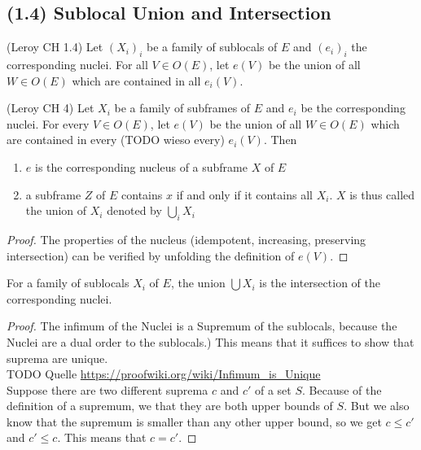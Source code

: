 \subsection{(1.4) Sublocal Union and Intersection}

\begin{definition}
(Leroy CH 1.4)
    \label{def:sublocal_union}
    \leanok
    Let $(X_i)_i$ be a family of sublocals of $E$ and $(e_i)_i$ the corresponding nuclei.
    For all $V \in O(E)$, let $e(V)$ be the union of all $W \in O(E)$ which are contained in all $e_i(V)$.
\end{definition}

\begin{lemma}
(Leroy CH 4)
    \label{lem:sublocal_union}
    \leanok
    Let $X_i$ be a family of subframes of $E$ and $e_i$ be the corresponding nuclei. For every $V \in O(E)$, let
    $e(V)$ be the union of all $W \in O(E)$ which are contained in every (TODO wieso every) $e_i(V)$. Then \\
    \begin{enumerate}
        \item $e$ is the corresponding nucleus of a subframe $X$ of $E$
        \item a subframe $Z$ of $E$ contains $x$ if and only if it contains all $X_i$. $X$ is thus called the union of
        $X_i$ denoted by $\bigcup_i X_i$
    \end{enumerate}
\end{lemma}
\begin{proof}
    The properties of the nucleus (idempotent, increasing, preserving intersection) can be verified by unfolding the
    definition of $e(V)$.
    \leanok
\end{proof}

\begin{lemma}
    \label{lem:sublocal_union_nucleus_intersection}
    \leanok
    For a family of sublocals $X_i$ of $E$, the union $\bigcup X_i$ is the intersection of the corresponding nuclei.
\end{lemma}
\begin{proof}
    The infimum of the Nuclei is a Supremum of the sublocals, because the Nuclei are a dual order to the sublocals.)
    This means that it suffices to show that suprema are unique. \\
    TODO Quelle \url{https://proofwiki.org/wiki/Infimum_is_Unique} \\
    Suppose there are two different suprema $c$ and $c'$ of a set $S$. Because of the definition of a supremum, we
    that they are both upper bounds of $S$. But we also know that the supremum is smaller than any other upper bound, so
    we get $c \le c'$ and $c' \le c$. This means that $c = c'$.
    \leanok

\end{proof}


